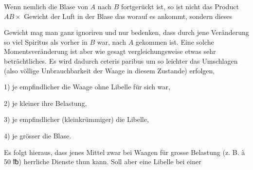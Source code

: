 \noindent\begin{minipage}[t]{.69\textwidth}\setlength{\parindent}{1.2em}\indent
Wenn nemlich die Blase von \(A\) nach \(B\) fortgerückt
ist, so ist nicht das Product \(AB\times\) Gewicht der Luft
in der Blase das worauf es ankommt, sondern dieses
\end{minipage}\hfill
\begin{minipage}[t]{.28\textwidth}\vspace{-1.4ex}\centering
{}
\end{minipage}\par\noindent
Gewicht mag man ganz ignoriren und nur bedenken, dass durch jene Veränderung
so viel Spiritus als vorher in \(B\) war, nach \(A\) gekommen ist. Eine solche
Momentsveränderung ist aber wie gesagt vergleichungsweise etwas sehr beträchtliches.
Es wird dadurch ceteris paribus um so leichter das Umschlagen
(also völlige Unbrauchbarkeit der Waage in diesem Zustande) erfolgen,
\par\noindent\hspace*{\parindent}1) je empfindlicher die Waage ohne Libelle für sich war,
\par\noindent\hspace*{\parindent}2) je kleiner ihre Belastung,
\par\noindent\hspace*{\parindent}3) je empfindlicher (kleinkrümmiger) die Libelle,
\par\noindent\hspace*{\parindent}4) je grösser die Blase.
\par\noindent\hspace*{\parindent}Es folgt hieraus, dass jenes Mittel zwar bei Waagen für grosse Belastung
(z. B. à 50 {℔}) herrliche Dienste thun kann. Soll aber eine Libelle bei einer
